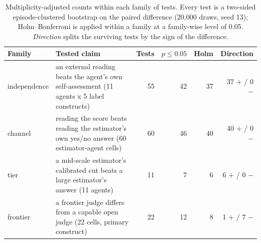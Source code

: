 \begin{table}[t]
\centering
\small
\caption{Multiplicity-adjusted counts within each family of tests. Every test is a two-sided episode-clustered bootstrap on the paired difference (20{,}000 draws, seed 13); Holm--Bonferroni is applied within a family at a family-wise level of 0.05. \emph{Direction} splits the surviving tests by the sign of the difference.}
\label{tab:holm}
\begin{tabular}{llrrrr}
\toprule
Family & Tested claim & Tests & $p\le0.05$ & Holm & Direction \\
\midrule
independence & an external reading beats the agent's own self-assessment (11 agents x 5 label constructs) & 55 & 42 & 37 & 37 $+$ / 0 $-$ \\
channel & reading the score beats reading the estimator's own yes/no answer (60 estimator-agent cells) & 60 & 46 & 40 & 40 $+$ / 0 $-$ \\
tier & a mid-scale estimator's calibrated cut beats a large estimator's answer (11 agents) & 11 & 7 & 6 & 6 $+$ / 0 $-$ \\
frontier & a frontier judge differs from a capable open judge (22 cells, primary construct) & 22 & 12 & 8 & 1 $+$ / 7 $-$ \\
\bottomrule
\end{tabular}
\end{table}
